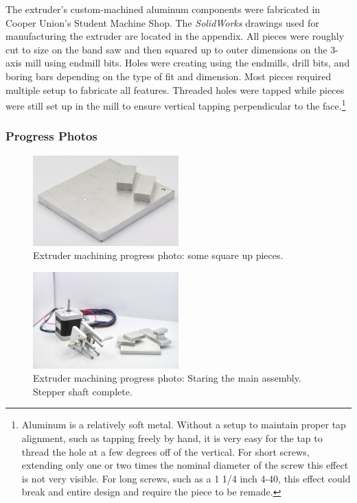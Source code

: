 \indent

The extruder's custom-machined aluminum components were fabricated in Cooper Union's Student Machine Shop. The \emph{SolidWorks} drawings used for manufacturing the extruder are located in the appendix. All pieces were roughly cut to size on the band saw and then squared up to outer dimensions on the 3-axis mill using endmill bits. Holes were creating using the endmills, drill bits, and boring bars depending on the type of fit and dimension. Most pieces required multiple setup to fabricate all features. Threaded holes were tapped while pieces were still set up in the mill to ensure vertical tapping perpendicular to the face.\footnote{Aluminum is a relatively soft metal. Without a setup to maintain proper tap alignment, such as tapping freely by hand, it is very easy for the tap to thread the hole at a few degrees off of the vertical. For short screws, extending only one or two times the nominal diameter of the screw this effect is not very visible. For long screws, such as a 1 1/4 inch 4-40, this effect could break and entire design and require the piece to be remade.}\\

\subsubsection{Progress Photos}


\indent

\begin{figure}[h!]
\centering
\includegraphics[width=0.5\textwidth]{./figures/extruder-progress-square}
\caption{Extruder machining progress photo: some square up pieces.}
\label{fig:extruder-progress-square}
\end{figure}


\begin{figure}[h!]
\centering
\includegraphics[width=0.5\textwidth]{./figures/extruder-progress-1}
\caption{Extruder machining progress photo: Staring the main assembly. Stepper shaft complete.}
\label{fig:extruder-progress-1}
\end{figure}

